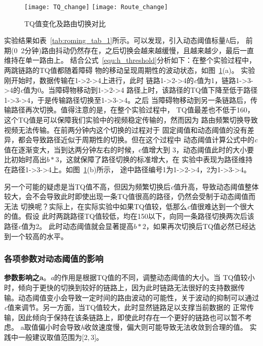 \begin{figure}[h]
  \centering
  \subcaptionbox{}
      {\texttt{[image: TQ\_change]}}
  \hspace{1em}
  \subcaptionbox{}
    {\texttt{[image: Route\_change]}}
  \caption{TQ值变化及路由切换对比}
  \label{fig:tq_route_change}
\end{figure}

实验结果如表~\ref{tab:roming_tab_1}所示。可以发现，引入动态阈值标量\emph{h}后，
前期(0~2分钟)路由抖动仍然存在，之后切换会越来越缓慢，且越来越少，最后一直维持在单一路由上。
结合公式~\ref{equ:h_threshold}分析如下：在整个实验过程中，两跳链路的TQ值都随着障碍
物的移动呈现周期性的波动状态，如图~\ref{fig:tq_route_change}(a)。
实验刚开始时，数据传输在1->2->4上进行，此时
链路1->2->4的\emph{c}值为1，链路1->3->4的\emph{c}值为0。当障碍物移动到1->2->4
路径上时，该路径的TQ值下降至低于路径1->3->4，于是传输路径切换至1->3->4。之后
当障碍物移动到另一条链路后，传输路径再次切换。值得注意的是，在整个实验过程中，
TQ值最差也不低于160，这个TQ值是可以保障我们实验中的视频稳定传输的，然而因为
路由频繁切换导致视频无法传输。在前两分钟内这个切换的过程对于
固定阈值和动态阈值的没有差异，都会导致路径近似于周期性的切换。但在这个过程中
动态阈值计算公式中的\emph{c}值在逐渐变大，当到达两分钟左右的时候，c值增大到
3，动态阈值此时的大小要比初始时高出$b*3$，这就保障了路径切换的标准增大，在
实验中表现为路径维持在路径1->3->4上。如图~\ref{fig:tq_route_change}(b)所示，
途中路径编号1为1->2->4，2为1->3->4。

另一个可能的疑虑是当TQ值不高，但因为频繁切换后\emph{c}值升高，导致动态阈值整体
较大，会不会导致此时即使出现一条TQ值很高的路径，仍然会受制于动态阈值而无法
切换呢？实际上，在实际实验中如果TQ值较，低那么\emph{c}值很难达到一个很大的值。假设
此时两跳路径TQ值较低，均在150以下，向同一条路径切换两次后该路径\emph{c}值为2。
此时动态阈值就会显著提高$b*2$，如果再次切换后TQ值必然已经达到一个较高的水平。

\subsubsection{各项参数对动态阈值的影响}
\textbf{参数影响之a}。\emph{a}的作用是根据TQ值的不同，调整动态阈值的大小。当
TQ值较小时，倾向于更快的切换到较好的链路上，因为此时链路无法很好的支持数据传
输。动态阈值变小会导致一定时间的路由波动的可能性，关于波动的抑制可以通过
\emph{c}值来调节。另一方面，当TQ值较大，此时显然链路足以支撑当前数据的
正常传输，因此倾向于保持在该条链路上，即使此时存在一个更好的链路也可以暂不考虑。
a取值偏小时会导致\emph{h}收敛速度慢，偏大则可能导致无法收敛到合理的值。
实践中一般建议取值范围为$\lbrack2,3\rbrack$。

